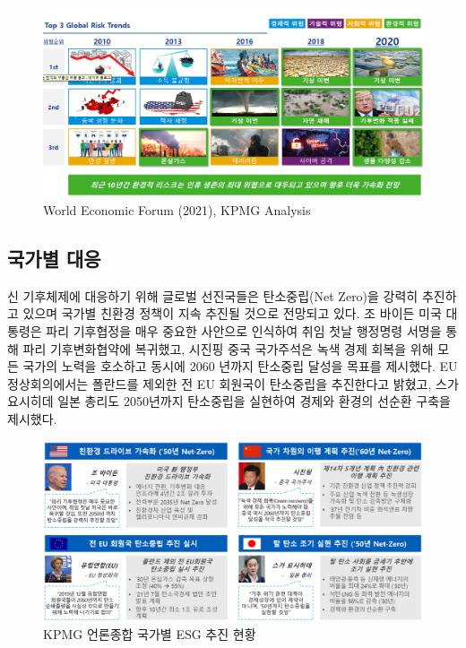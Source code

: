 \documentclass[smallextended]{svjour3}       %
\begin{document}
\begin{figure}

{\centering \includegraphics[width=1\linewidth]{fig/esg-rising} 

}

\caption{World Economic Forum (2021), KPMG Analysis}\label{fig:esg-risign}
\end{figure}

\hypertarget{response-to-climate-change}{%
\subsection{국가별 대응}\label{response-to-climate-change}}

신 기후체제에 대응하기 위해 글로벌 선진국들은 탄소중립(Net Zero)을
강력히 추진하고 있으며 국가별 친환경 정책이 지속 추진될 것으로 전망되고
있다. 조 바이든 미국 대통령은 파리 기후협정을 매우 중요한 사안으로
인식하여 취임 첫날 행정명령 서명을 통해 파리 기후변화협약에 복귀했고,
시진핑 중국 국가주석은 녹색 경제 회복을 위해 모든 국가의 노력을 호소하고
동시에 2060 년까지 탄소중립 달성을 목표를 제시했다. EU 정상회의에서는
폴란드를 제외한 전 EU 회원국이 탄소중립을 추진한다고 밝혔고, 스가
요시히데 일본 총리도 2050년까지 탄소중립을 실현하여 경제와 환경의 선순환
구축을 제시했다.

\begin{figure}

{\centering \includegraphics[width=1\linewidth]{fig/esg-countries} 

}

\caption{KPMG 언론종합 국가별 ESG 추진 현황}\label{fig:esg-countries}
\end{figure}
\end{document}
